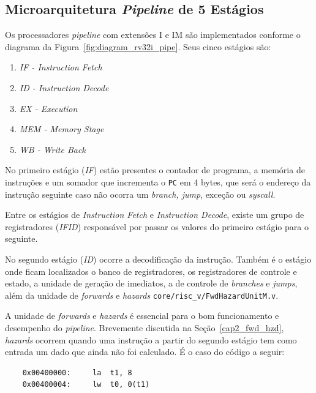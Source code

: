     \subsection{Microarquitetura \textit{Pipeline} de 5 Estágios}
        { Os processadores \textit{pipeline} com extensões I e IM são
            implementados conforme o diagrama da Figura~\ref{fig:diagram_rv32i_pipe}.
            Seus cinco estágios são:
            \begin{enumerate}
                \item \textit{IF - Instruction Fetch}
                \item \textit{ID - Instruction Decode}
                \item \textit{EX - Execution}
                \item \textit{MEM - Memory Stage}
                \item \textit{WB - Write Back}
            \end{enumerate}
        }

        { No primeiro estágio (\textit{IF}) estão presentes o contador de programa,
            a memória de instruções e um somador que incrementa o \texttt{PC} em 4
            bytes, que será o endereço da instrução seguinte caso não ocorra um
            \textit{branch, jump}, exceção ou \textit{syscall}.
        }

        { Entre os estágios de \textit{Instruction Fetch} e \textit{Instruction
            Decode}, existe um grupo de registradores (\textit{IFID}) responsável
            por passar os valores do primeiro estágio para o seguinte.
        }

        { No segundo estágio (\textit{ID}) ocorre a decodificação da instrução.
            Também é o estágio onde ficam localizados o banco de registradores,
            os registradores de controle e estado, a unidade de geração de imediatos,
            a de controle de \textit{branches} e \textit{jumps}, além da unidade
            de \textit{forwards} e \textit{hazards} \texttt{core/risc\_v/FwdHazardUnitM.v}.
        }

        { A unidade de \textit{forwards} e \textit{hazards} é essencial para o
            bom funcionamento e desempenho do \textit{pipeline}. Brevemente discutida
            na Seção~\ref{cap2_fwd_hzd}, \textit{hazards} ocorrem quando uma instrução
            a partir do segundo estágio tem como entrada um dado que ainda não foi
            calculado. É o caso do código a seguir:
        }
        \begin{lstlisting}
    0x00400000:     la  t1, 8
    0x00400004:     lw  t0, 0(t1)
        \end{lstlisting}


